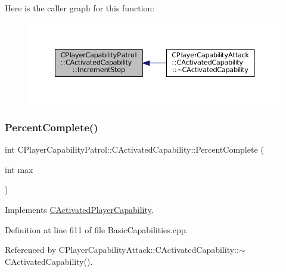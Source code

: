 Here is the caller graph for this function\+:\nopagebreak
\begin{figure}[H]
\begin{center}
\leavevmode
\includegraphics[width=350pt]{classCPlayerCapabilityPatrol_1_1CActivatedCapability_a576a71646225c0723a0ed9e77add01fd_icgraph}
\end{center}
\end{figure}
\hypertarget{classCPlayerCapabilityPatrol_1_1CActivatedCapability_a868e6583a55b01e5aa3b926ef14677bc}{}\label{classCPlayerCapabilityPatrol_1_1CActivatedCapability_a868e6583a55b01e5aa3b926ef14677bc} 
\subsubsection{\texorpdfstring{Percent\+Complete()}{PercentComplete()}}
{\footnotesize\ttfamily int C\+Player\+Capability\+Patrol\+::\+C\+Activated\+Capability\+::\+Percent\+Complete (\begin{DoxyParamCaption}\item[{int}]{max }\end{DoxyParamCaption})\hspace{0.3cm}{\ttfamily [virtual]}}



Implements \hyperlink{classCActivatedPlayerCapability_a405dc6076058006a4f801727de4cfe4d}{C\+Activated\+Player\+Capability}.



Definition at line 611 of file Basic\+Capabilities.\+cpp.



Referenced by C\+Player\+Capability\+Attack\+::\+C\+Activated\+Capability\+::$\sim$\+C\+Activated\+Capability().


